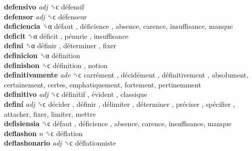 \textbf{defensivo} \emph{adj}  ␝ϲ   défensif   \\
\textbf{defensor} \emph{adj}  ␝ϲ   défenseur   \\
\textbf{deficiencia} ␝α   défaut ,  déficience , absence, carence, insuffisance, manque  \\
\textbf{deficit} ␝α   déficit ,  pénurie , insuffisance  \\
\textbf{defini} ␝α   définir ,  déterminer , fixer  \\
\textbf{definicion} ␝α   définition   \\
\textbf{definishon} ␝ϲ   définition , notion  \\
\textbf{definitivamente} \emph{adv}  ␝ϲ   carrément ,  décidément ,  définitivement , absolument, certainement, certes, emphatiquement, fortement, pertinemment  \\
\textbf{definitivo} \emph{adj}  ␝ϲ   définitif ,  évident , classique  \\
\textbf{definí} \emph{adj}  ␝ϲ   décider ,  définir ,  délimiter ,  déterminer ,  préciser ,  spécifier , attacher, fixer, limiter, mettre  \\
\textbf{defisiensia} ␝ϲ   défaut ,  déficience , absence, carence, insuffisance, manque  \\
\textbf{deflashon} \emph{n}  ␝ϲ   déflation   \\
\textbf{deflashonario} \emph{adj}  ␝ϲ   déflationniste   \\
